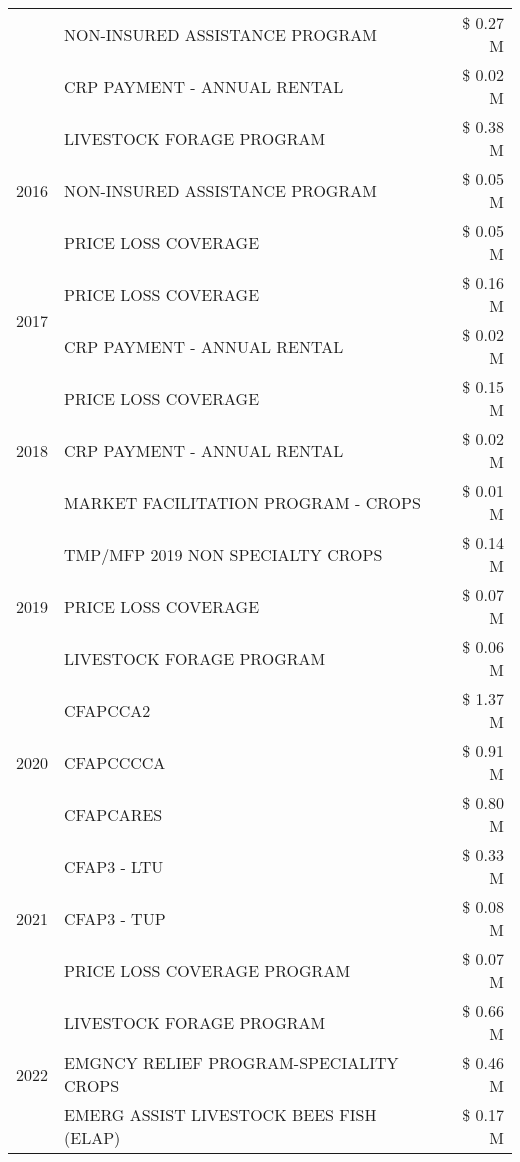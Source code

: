 \begin{tabular}{llr}
 & NON-INSURED ASSISTANCE PROGRAM & \$ 0.27 M \\
 & CRP PAYMENT - ANNUAL RENTAL & \$ 0.02 M \\
\cline{1-3}
\multirow[t]{3}{*}{2016} & LIVESTOCK FORAGE PROGRAM & \$ 0.38 M \\
 & NON-INSURED ASSISTANCE PROGRAM & \$ 0.05 M \\
 & PRICE LOSS COVERAGE & \$ 0.05 M \\
\cline{1-3}
\multirow[t]{2}{*}{2017} & PRICE LOSS COVERAGE & \$ 0.16 M \\
 & CRP PAYMENT - ANNUAL RENTAL & \$ 0.02 M \\
\cline{1-3}
\multirow[t]{3}{*}{2018} & PRICE LOSS COVERAGE & \$ 0.15 M \\
 & CRP PAYMENT - ANNUAL RENTAL & \$ 0.02 M \\
 & MARKET FACILITATION PROGRAM - CROPS & \$ 0.01 M \\
\cline{1-3}
\multirow[t]{3}{*}{2019} & TMP/MFP 2019 NON SPECIALTY CROPS & \$ 0.14 M \\
 & PRICE LOSS COVERAGE & \$ 0.07 M \\
 & LIVESTOCK FORAGE PROGRAM & \$ 0.06 M \\
\cline{1-3}
\multirow[t]{3}{*}{2020} & CFAPCCA2 & \$ 1.37 M \\
 & CFAPCCCCA & \$ 0.91 M \\
 & CFAPCARES & \$ 0.80 M \\
\cline{1-3}
\multirow[t]{3}{*}{2021} & CFAP3 - LTU & \$ 0.33 M \\
 & CFAP3 - TUP & \$ 0.08 M \\
 & PRICE LOSS COVERAGE PROGRAM & \$ 0.07 M \\
\cline{1-3}
\multirow[t]{3}{*}{2022} & LIVESTOCK FORAGE PROGRAM & \$ 0.66 M \\
 & EMGNCY RELIEF PROGRAM-SPECIALITY CROPS & \$ 0.46 M \\
 & EMERG ASSIST LIVESTOCK BEES FISH (ELAP) & \$ 0.17 M \\
\cline{1-3}
\bottomrule
\end{tabular}
